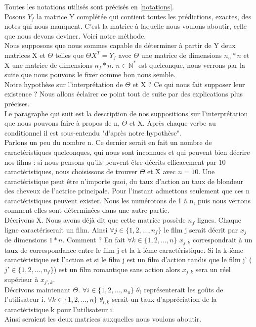 \documentclass[a4paper,10pt]{article}
\begin{document}
Toutes les notations utilisés sont précisés en \ref{notations}.\\

Posons $Y_f$ la matrice Y complétée qui contient toutes les prédictions, exactes, des notes qui nous manquent. C'est la matrice à laquelle nous voulons aboutir, celle que nous devons deviner. Voici notre méthode.\\ 
 
Nous supposons que nous sommes capable de déterminer à partir de Y deux matrices X et $\Theta$ telles que $\Theta X^T = Y_f$ avec $\Theta$ une matrice de dimensions $n_u * n$ et X une matrice de dimensions $n_f * n$. $n \in \mathbb{N}^*$ est quelconque, nous verrons par la suite que nous pouvons le fixer comme bon nous semble.\\ 
Notre hypothèse sur l'interprétation de $\Theta$ et X ? Ce qui nous fait supposer leur existence ? Nous allons éclairer ce point tout de suite par des explications plus précises.\\

Le paragraphe qui suit est la description de nos suppositions sur l'interprétation que nous pouvons faire à propos de n, $\Theta$ et X. Après chaque verbe au conditionnel il est sous-entendu "d'après notre hypothèse".\\
Parlons un peu du nombre n. Ce dernier serait en fait un nombre de caractéristiques quelconques, qui nous sont inconnues et qui peuvent bien décrire nos films : si nous pensons qu'ils peuvent être décrits efficacement par 10 caractéristiques, nous choisissons de trouver $\Theta$ et X avec $n = 10$. 
Une caractéristique peut être n'importe quoi, du taux d'action au taux de blondeur des cheveux de l'actrice principale. Pour l'instant admettons seulement que ces n caractéristiques peuvent exister. Nous les numérotons de 1 à n, puis nous verrons comment elles sont déterminées dans une autre partie.\\
Décrivons X. Nous avons déjà dit que cette matrice possède $n_f$ lignes. Chaque ligne caractériserait un film. Ainsi $\forall j \in \{1, 2, ..., n_f\}$ le film j serait décrit par $x_j$ de dimensions $1 * n$. Comment ? En fait $\forall k \in \{1, 2, ..., n\}$ $x_{j,k}$ correspondrait à un taux de correspondance entre le film j et la k-ième caractéristique. Si la k-ième caractéristique est l'action et si le film j est un film d'action tandis que le film j' ($j' \in \{1, 2, ..., n_f\}$) est un film romantique sans action alors $x_{j,k}$ sera un réel supérieur à $x_{j',k}$.\\
Décrivons maintenant $\Theta$. $\forall i \in \{1, 2, ..., n_u\}$ $\theta_{i}$ représenterait les goûts de l'utilisateur i. $\forall k \in \{1, 2, ..., n\}$ $\theta_{i,k}$ serait un taux d'appréciation de la caractéristique k pour l'utilisateur i.\\
Ainsi seraient les deux matrices auxquelles nous voulons aboutir.\\
\end{document}
